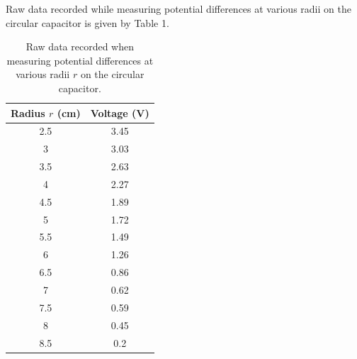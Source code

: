 \documentclass[letterpaper]{article}
\begin{document}
Raw data recorded while measuring potential differences at various radii on
the circular capacitor is given by Table 1.
\begin{table}[H]
\centering
\begin{tabular}{|c|c|}
\hline
 Radius $r$ (cm) & Voltage (V)\\ \hline
 2.5         & 3.45        \\ \hline
 3           & 3.03        \\ \hline
 3.5         & 2.63        \\ \hline
 4           & 2.27        \\ \hline
 4.5         & 1.89        \\ \hline
 5           & 1.72        \\ \hline
 5.5         & 1.49        \\ \hline
 6           & 1.26        \\ \hline
 6.5         & 0.86        \\ \hline
 7           & 0.62        \\ \hline
 7.5         & 0.59        \\ \hline
 8           & 0.45        \\ \hline
 8.5         & 0.2         \\ \hline
\end{tabular}
\caption{Raw data recorded when measuring potential differences at various radii $r$ on the circular capacitor.}
\end{table}
\end{document}
